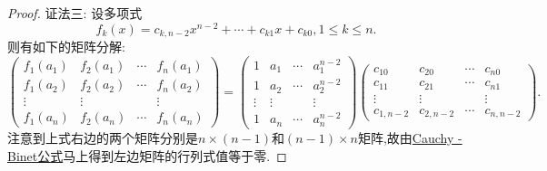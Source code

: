 \documentclass[../../main.tex]{subfiles}%
\begin{document}
\begin{proof}
{\color{blue}证法三:}
设多项式
\[
f_k(x)=c_{k,n - 2}x^{n - 2}+\cdots+c_{k1}x + c_{k0},1\leqslant  k\leqslant  n.
\]
则有如下的矩阵分解:
\[
\begin{pmatrix}
f_1(a_1) & f_2(a_1) & \cdots & f_n(a_1)\\
f_1(a_2) & f_2(a_2) & \cdots & f_n(a_2)\\
\vdots & \vdots & & \vdots\\
f_1(a_n) & f_2(a_n) & \cdots & f_n(a_n)
\end{pmatrix}
=
\begin{pmatrix}
1 & a_1 & \cdots & a_1^{n - 2}\\
1 & a_2 & \cdots & a_2^{n - 2}\\
\vdots & \vdots & & \vdots\\
1 & a_n & \cdots & a_n^{n - 2}
\end{pmatrix}
\begin{pmatrix}
c_{10} & c_{20} & \cdots & c_{n0}\\
c_{11} & c_{21} & \cdots & c_{n1}\\
\vdots & \vdots & & \vdots\\
c_{1,n - 2} & c_{2,n - 2} & \cdots & c_{n,n - 2}
\end{pmatrix}.
\]
注意到上式右边的两个矩阵分别是\(n\times(n - 1)\)和\((n - 1)\times n\)矩阵,故由\hyperref[theorem:Cauchy-Binet公式]{Cauchy - Binet公式}马上得到左边矩阵的行列式值等于零.
\end{proof}
\end{document}

